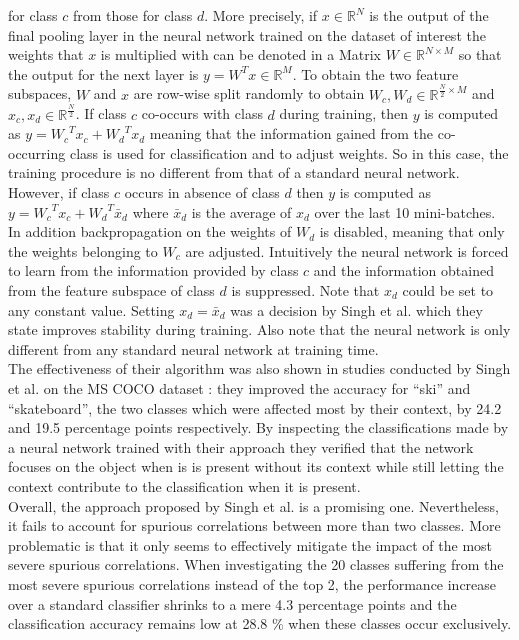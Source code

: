 \documentclass{article}
\begin{document}
for class $c$ from those for class $d$. More precisely, if $x \in \mathbb{R}^N$ is the output of the final pooling layer
in the neural network trained on the dataset of interest the weights that $x$ is multiplied with can be denoted in a Matrix
$W \in \mathbb{R}^{N \times M}$ so that the output for the next layer is $y=W^Tx \in \mathbb{R}^M$. To obtain the two
feature subspaces, $W$ and $x$ are row-wise split randomly to obtain $W_c,W_d \in \mathbb{R}^{\frac{N}{2} \times M}$
and $x_c, x_d \in \mathbb{R}^{\frac{N}{2}}$. If class $c$ co-occurs with class $d$ during training, then $y$ is computed
as $y={W_c}^T x_c + {W_d}^T x_d$ meaning that the information gained from the co-occurring class is used for classification
and to adjust weights. So in this case, the training procedure is no different from that of a standard neural network.
However, if class $c$ occurs in absence of class $d$ then $y$ is computed as $y={W_c}^T x_c + {W_d}^T \bar{x}_d$ where
$\bar{x}_d$ is the average of $x_d$ over the last 10 mini-batches. In addition backpropagation on the weights of $W_d$
is disabled, meaning that only the weights belonging to $W_c$ are adjusted. Intuitively the neural network is forced to
learn from the information provided by class $c$ and the information obtained from the feature subspace of class $d$ is suppressed.
Note that $x_d$ could be set to any constant value. Setting $x_d = \bar{x}_d$ was a decision by Singh et al. which they state improves
stability during training. Also note that the neural network is only different from any standard neural network at training time. \\
The effectiveness of their algorithm was also shown in studies conducted by Singh et al. on the MS COCO dataset \cite{lin2015microsoft}:
they improved the accuracy for \enquote{ski} and \enquote{skateboard}, the two classes which were affected most by their context,
by 24.2 and 19.5 percentage points respectively. By inspecting the classifications made by a neural network trained with their
approach they verified that the network focuses on the object when is is present without its context while still letting the context contribute to the classification when it is present. \\
Overall, the approach proposed by Singh et al. is a promising one. Nevertheless, it fails to account for spurious correlations between
more than two classes. More problematic is that it only seems to effectively mitigate the impact of the most severe spurious correlations.
When investigating the 20 classes suffering from the most severe spurious correlations instead of the top 2, the performance increase
over a standard classifier shrinks to a mere 4.3 percentage points and the classification accuracy remains low at 28.8 \% when these
classes occur exclusively.
\end{document}
